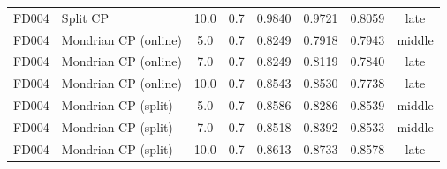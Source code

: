 \begin{table}[t]
\begin{tabular}{llcccccc}
FD004 & Split CP & 10.0 & 0.7 & 0.9840 & 0.9721 & 0.8059 & late \\
FD004 & Mondrian CP (online) & 5.0 & 0.7 & 0.8249 & 0.7918 & 0.7943 & middle \\
FD004 & Mondrian CP (online) & 7.0 & 0.7 & 0.8249 & 0.8119 & 0.7840 & late \\
FD004 & Mondrian CP (online) & 10.0 & 0.7 & 0.8543 & 0.8530 & 0.7738 & late \\
FD004 & Mondrian CP (split) & 5.0 & 0.7 & 0.8586 & 0.8286 & 0.8539 & middle \\
FD004 & Mondrian CP (split) & 7.0 & 0.7 & 0.8518 & 0.8392 & 0.8533 & middle \\
FD004 & Mondrian CP (split) & 10.0 & 0.7 & 0.8613 & 0.8733 & 0.8578 & late \\
\bottomrule
\end{tabular}
\end{table}
